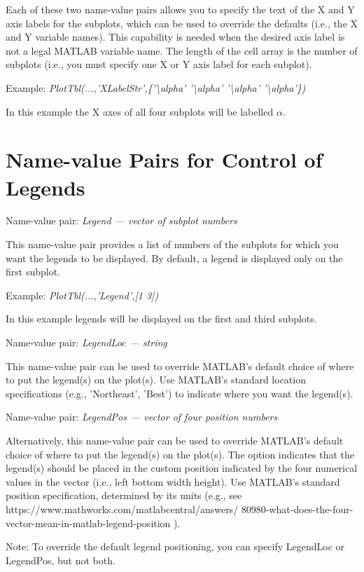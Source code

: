\documentclass{article}
\newcommand{\example}[1]{Example: {\it #1}}
\newcommand{\namevalue}[2]{{\it #1 --- #2}}
\begin{document}
Each of these two name-value pairs allows you to specify the text of the X and Y axis labels for the
subplots, which can be used to override the defaults (i.e., the X and Y variable names).
This capability is needed when the desired axis label is not a legal MATLAB variable name.
The length of the cell array is the number of subplots (i.e., you must specify
one X or Y axis label for each subplot).

\example{PlotTbl(...,'XLabelStr',\{'\textbackslash alpha' '\textbackslash alpha' '\textbackslash alpha' '\textbackslash alpha'\})}

In this example the X axes of all four subplots will be labelled $\alpha$.

\section{Name-value Pairs for Control of Legends}

Name-value pair: \namevalue{Legend}{vector of subplot numbers}

This name-value pair provides a list of numbers of the subplots for which you want the legends to be displayed.
By default, a legend is displayed only on the first subplot.

\example{PlotTbl(...,'Legend',[1 3])}

In this example legends will be displayed on the first and third subplots.

Name-value pair: \namevalue{LegendLoc}{string}

This name-value pair can be used to override MATLAB's default choice of where to
put the legend(s) on the plot(s).
Use MATLAB's standard location specifications (e.g., 'Northeast', 'Best')
to indicate where you want the legend(s).

Name-value pair: \namevalue{LegendPos}{vector of four position numbers}

Alternatively, this name-value pair can be used to override MATLAB's default choice of where to
put the legend(s) on the plot(s).
The option indicates that the legend(s) should be placed in the custom position
indicated by the four numerical values in the vector (i.e., left bottom width height).
Use MATLAB's standard position specification, determined by its units
(e.g., see https://www.mathworks.com/matlabcentral/answers/ 80980-what-does-the-four-vector-mean-in-matlab-legend-position ).

Note: To override the default legend positioning, you can specify LegendLoc or LegendPos, but not both.
\end{document}
